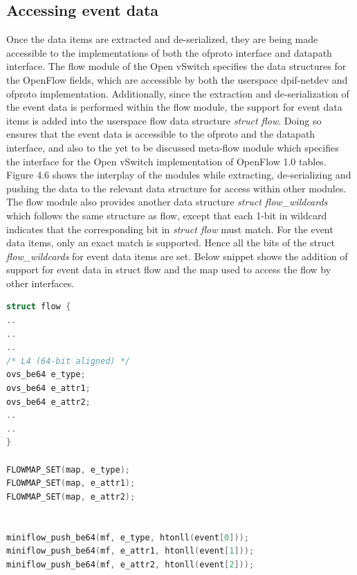 \subsection{Accessing event data}
Once the data items are extracted and de-serialized, they are being made accessible to the implementations of both the ofproto interface and datapath interface. The flow module of the Open vSwitch specifies the data structures for the OpenFlow fields, which are accessible by both the userspace dpif-netdev and ofproto implementation. Additionally, since the extraction and de-serialization of the event data is performed within the flow module, the support for event data items is added into the userspace flow data structure \textit{struct flow}. Doing so ensures that the event data is accessible to the ofproto and the datapath interface, and also to the yet to be discussed meta-flow module which specifies the interface for the Open vSwitch implementation of OpenFlow 1.0 tables. Figure 4.6 shows the interplay of the modules while extracting, de-serializing and pushing the data to the relevant data structure for access within other modules. The flow module also provides another data structure \textit{struct flow_wildcards} which follows the same structure as flow, except that each 1-bit in wildcard indicates that the corresponding bit in \textit{struct flow} must match. For the event data items, only an exact match is supported. Hence all the bits of the struct \textit{flow_wildcards} for event data items are set. Below snippet shows the addition of support for event data in struct flow and the map used to access the flow by other interfaces. \newline

\begin{lstlisting}[language=c]
struct flow {
..
..
..
/* L4 (64-bit aligned) */
ovs_be64 e_type;
ovs_be64 e_attr1;
ovs_be64 e_attr2;
..
..
}

FLOWMAP_SET(map, e_type);  
FLOWMAP_SET(map, e_attr1);  
FLOWMAP_SET(map, e_attr2);  


miniflow_push_be64(mf, e_type, htonll(event[0]));                   
miniflow_push_be64(mf, e_attr1, htonll(event[1]));
miniflow_push_be64(mf, e_attr2, htonll(event[2]));
\end{lstlisting}



